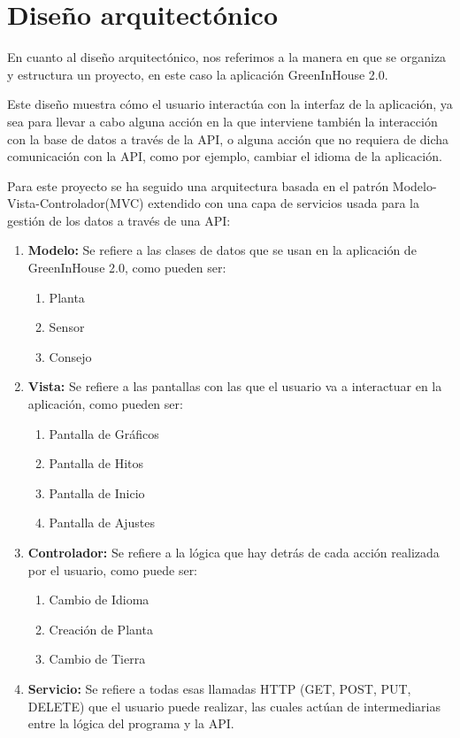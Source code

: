 \section{Diseño arquitectónico}
En cuanto al diseño arquitectónico, nos referimos a la manera en que se organiza y estructura un proyecto, en este caso la aplicación GreenInHouse 2.0.

Este diseño muestra cómo el usuario interactúa con la interfaz de la aplicación, ya sea para llevar a cabo alguna acción en la que interviene también la interacción con la base de datos a través de la API, o alguna acción que no requiera de dicha comunicación con la API, como por ejemplo, cambiar el idioma de la aplicación.

Para este proyecto se ha seguido una arquitectura basada en el patrón Modelo-Vista-Controlador(MVC) extendido con una capa de servicios usada para la gestión de los datos a través de una API:
\begin{enumerate}
    \item \textbf{Modelo:}
   Se refiere a las clases de datos que se usan en la aplicación de GreenInHouse 2.0, como pueden ser:
    \begin{enumerate}
        \item {Planta}
        \item {Sensor}
        \item {Consejo}
    \end{enumerate}
    \item \textbf{Vista:}
    Se refiere a las pantallas con las que el usuario va a interactuar en la aplicación, como pueden ser:
    \begin{enumerate}
        \item {Pantalla de Gráficos}
        \item {Pantalla de Hitos}
        \item {Pantalla de Inicio}
        \item {Pantalla de Ajustes}
    \end{enumerate}
    \item \textbf{Controlador:}
    Se refiere a la lógica que hay detrás de cada acción realizada por el usuario, como puede ser:
    \begin{enumerate}
        \item {Cambio de Idioma}
        \item {Creación de Planta}
        \item {Cambio de Tierra}
    \end{enumerate}
    \item \textbf{Servicio:}
    Se refiere a todas esas llamadas HTTP (GET, POST, PUT, DELETE) que el usuario puede realizar, las cuales actúan de intermediarias entre la lógica del programa y la API.
\end{enumerate} 

